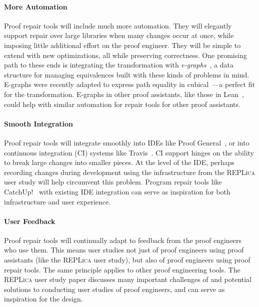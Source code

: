 \paragraph{More Automation}
Proof repair tools will include much more automation.
They will elegantly support repair over large libraries when many changes occur at once,
while imposing little additional effort on the proof engineer.
They will be simple to extend with new optimizations, all while preserving correctness.
One promising path to these ends is integrating the \toolnamec transformation with \textit{e-graphs}~\cite{egraph1},
a data structure %
for managing equivalences
built with these kinds of problems in mind.
E-graphs were recently adapted to express path equality in cubical~\cite{egraph6}---a perfect fit for the \toolnamec transformation.
E-graphs in other proof assistants, like those in Lean~\cite{selsam:lean}, could help with similar automation for repair tools for other proof assistants.

\paragraph{Smooth Integration}
Proof repair tools will integrate smoothly into IDEs like Proof General~\cite{proofgeneral},
or into continuous integration (CI) systems like Travis~\cite{travis}.
CI support hinges on the ability to break large changes into smaller pieces.
At the level of the IDE, perhaps recording changes during development using the infrastructure
from the \textsc{REPLica} user study will help circumvent this problem.
Program repair tools like CatchUp!~\cite{Henkel:2005:CCR:1062455.1062512} with existing IDE integration can
serve as inspiration for both infrastructure and user experience.

\paragraph{User Feedback} 
Proof repair tools will continually adapt to feedback from the proof engineers who use them.
This means user studies not just of proof engineers using proof assistants (like the \textsc{REPLica} user study),
but also of proof engineers using proof repair tools.
The same principle applies to other proof engineering tools.
The \textsc{REPLica} user study paper discusses many important challenges of and potential solutions to conducting user studies
of proof engineers, and can serve as inspiration for the design.

